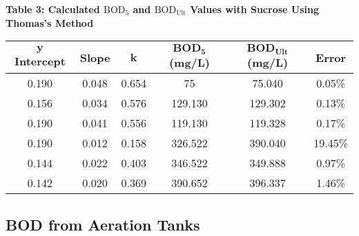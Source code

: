 \newpage
\begin{center}
{\large {\bf Table 3: Calculated \(\text{BOD}_5\) and \(\text{BOD}_\text{Ult}\) Values with Sucrose Using Thomas's Method\\}}
\vspace{2mm}
\begin{tabular}{|cccccc|} 
    \hline
    \(\bm{y}\) \textbf{Intercept} & \textbf{Slope} & \(\bm{k}\)     & \(\textbf{BOD}_\textbf{5}\) \textbf{(mg/L)} & \(\textbf{BOD}_\textbf{Ult}\) \textbf{(mg/L)}  & \textbf{Error}    \\ 
    \hline
    0.190         & 0.048 & 0.654 & 75      & 75.040   & 0.05\%   \\
    0.156         & 0.034 & 0.576 & 129.130 & 129.302  & 0.13\%   \\
    0.190         & 0.041 & 0.556 & 119.130 & 119.328  & 0.17\%   \\
    0.190         & 0.012 & 0.158 & 326.522 & 390.040  & 19.45\%  \\
    0.144         & 0.022 & 0.403 & 346.522 & 349.888  & 0.97\%   \\
    0.142         & 0.020 & 0.369 & 390.652 & 396.337  & 1.46\%   \\
    \hline
\end{tabular}
\end{center}
\newpage
\subsection{BOD from Aeration Tanks}


